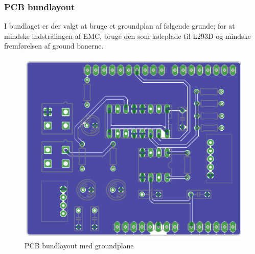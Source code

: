\newpage
\subsubsection{PCB bundlayout}
I bundlaget er der valgt at bruge et groundplan af følgende grunde; for at mindske indstrålingen af EMC, bruge den som køleplade til L293D og mindske fremførelsen af ground banerne. 

\begin{figure}[H]
	\centering
	\includegraphics[width=1\textwidth]{billeder/hardware/Bundlayout.png}
	\caption{PCB bundlayout med groundplane}
	\label{fig:PCBbundlayout}
\end{figure}

\newpage
